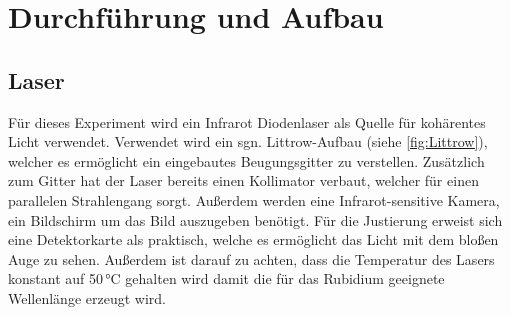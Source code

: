 \section{Durchführung und Aufbau}
\label{sec:Durchführung}

\subsection{Laser}
\label{sec:AufbLaser}
Für dieses Experiment wird ein Infrarot Diodenlaser als Quelle für kohärentes Licht verwendet. Verwendet wird ein sgn. Littrow-Aufbau (siehe \autoref{fig:Littrow}), welcher es ermöglicht ein eingebautes Beugungsgitter
zu verstellen. Zusätzlich zum Gitter hat der Laser bereits einen Kollimator verbaut, welcher für einen parallelen Strahlengang sorgt.
Außerdem werden eine Infrarot-sensitive Kamera, ein Bildschirm um das Bild auszugeben benötigt. Für die Justierung erweist sich eine Detektorkarte als praktisch, welche es 
ermöglicht das Licht mit dem bloßen Auge zu sehen. Außerdem ist darauf zu achten, dass die Temperatur des Lasers konstant auf 50\,\unit{\celsius} gehalten wird damit die für das Rubidium geeignete Wellenlänge erzeugt wird.


